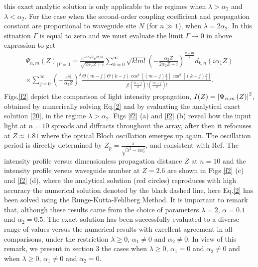 \documentclass[12pt]{article}
\numberwithin{equation}{section}
\begin{document}
this exact analytic solution is only applicable to the regimes when $\lambda>\alpha_{2}$ and $\lambda<\alpha_{2}$. For the case when
the second-order coupling coefficient and propagation constant are proportional to waveguide site $N$ (for $n\gg1$), when $\lambda=2\alpha_{2}$. In this situation $\Gamma$ is equal to zero and we must  evaluate the limit $\Gamma\rightarrow 0$ in above expression to get
\begin{align} \label{21}
\Psi_{n,m}\left(Z \right)_{|{\Gamma=0}}= \frac{e^{-i\alpha_{2} Z} e^{i\pi/4}}{\sqrt{2\alpha_{2}Z+i}}
\sum_{k=0}^{\infty} \sqrt{k! m!} \left(-\frac{\alpha_{2} Z}{2\alpha_{2} Z + i}\right)^{\frac{k+m}{2}} d_{k,n}\left(i\alpha_{1} Z\right) 
\nonumber\\ \times
\sum_{j=0}^{\infty} \left(-\frac{e^{i\frac{\pi}{2}}}{\alpha_{2} Z}\right)^{j} \frac{\Theta\left(m-j \right)  \Theta\left(k-j \right) 
\cos^2\left[\left(m-j \right)\frac{\pi}{2}  \right] \cos^2\left[\left(k-j \right)\frac{\pi}{2}  \right]}{j! \left(\frac{k-j}{2}\right)! \left(\frac{m-j}{2}\right)!}.
\end{align}
Figs.\eqref{f2} depict the comparison of light intensity propagation, $I(Z)=\abs{\Psi_{n,m}\left(Z \right)}^2$, obtained by numerically solving Eq.\eqref{2} and by evaluating the analytical exact solution \eqref{20}, in the regime $\lambda>\alpha_{2}$. Figs \eqref{f2} (a) and \eqref{f2} (b) reveal how the input light at $n=10$ spreads and diffracts throughout the array, after then it refocuses at $Z \approx 1.81$ where the optical Bloch oscillation emerges up again. The oscillation period is directly determined by $Z_{p}=\frac{\pi}{\sqrt{\lambda^2-4\alpha^2_{2}}}$, and consistent with Ref\cite{13A}. The intensity profile versus dimensionless propagation distance $Z$ at $n=10$ and the intensity profile versus waveguide number at $Z=2.6$ are shown in Figs \eqref{f2} (c) and  \eqref{f2} (d), where the analytical solution (red circles) reproduces with high accuracy the numerical solution denoted by the black dashed line, here  Eq.\eqref{2} has been solved using the Runge-Kutta-Fehlberg Method. It is important to remark that, although these results came from the choice of parameters $\lambda=2$, $\alpha=0.1$ and $\alpha_{2}=0.5$. The exact solution has been successfully evaluated to a diverse range of values versus the numerical results with excellent agreement in all comparisons, under the restriction $\lambda \geq 0$, $\alpha_{1} \neq 0$ and $\alpha_{2}  \neq 0$. In view of this remark, we present in section 3 the cases when $\lambda \geq 0$, $\alpha_{1} =0$ and $\alpha_{2} \neq 0$ and when $\lambda \geq 0$, $\alpha_{1} \neq 0$ and $\alpha_{2}=0$.
\end{document}
